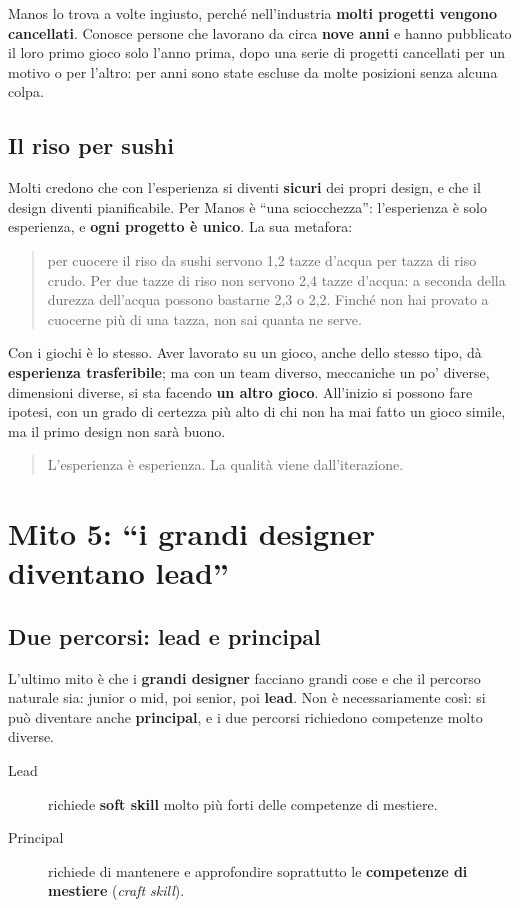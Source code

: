 Manos lo trova a volte ingiusto, perché nell'industria \textbf{molti progetti
vengono cancellati}. Conosce persone che lavorano da circa \textbf{nove anni} e
hanno pubblicato il loro primo gioco solo l'anno prima, dopo una serie di progetti
cancellati per un motivo o per l'altro: per anni sono state escluse da molte
posizioni senza alcuna colpa.

\subsection{Il riso per sushi}

Molti credono che con l'esperienza si diventi \textbf{sicuri} dei propri design, e
che il design diventi pianificabile. Per Manos è ``una sciocchezza'': l'esperienza è
solo esperienza, e \textbf{ogni progetto è unico}. La sua metafora:
\begin{quote}
per cuocere il riso da sushi servono 1,2 tazze d'acqua per tazza di riso crudo. Per
due tazze di riso non servono 2,4 tazze d'acqua: a seconda della durezza
dell'acqua possono bastarne 2,3 o 2,2. Finché non hai provato a cuocerne più di una
tazza, non sai quanta ne serve.
\end{quote}
Con i giochi è lo stesso. Aver lavorato su un gioco, anche dello stesso tipo, dà
\textbf{esperienza trasferibile}; ma con un team diverso, meccaniche un po' diverse,
dimensioni diverse, si sta facendo \textbf{un altro gioco}. All'inizio si possono
fare ipotesi, con un grado di certezza più alto di chi non ha mai fatto un gioco
simile, ma il primo design non sarà buono.
\begin{quote}
L'esperienza è esperienza. La qualità viene dall'iterazione.
\end{quote}

\section{Mito 5: ``i grandi designer diventano lead''}
\label{sec:c2-6-mito5}

\subsection{Due percorsi: lead e principal}

L'ultimo mito è che i \textbf{grandi designer} facciano grandi cose e che il
percorso naturale sia: junior o mid, poi senior, poi \textbf{lead}. Non è
necessariamente così: si può diventare anche \textbf{principal}, e i due percorsi
richiedono competenze molto diverse.
\begin{description}
  \item[Lead] richiede \textbf{soft skill} molto più forti delle competenze di
        mestiere.
  \item[Principal] richiede di mantenere e approfondire soprattutto le
        \textbf{competenze di mestiere} (\emph{craft skill}).
\end{description}

